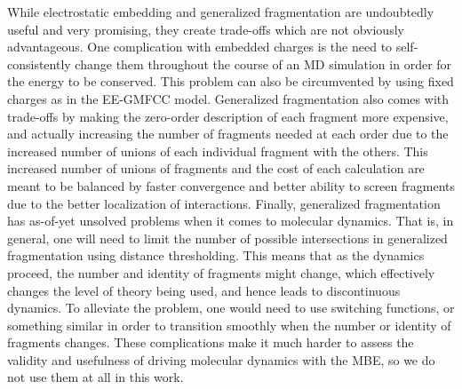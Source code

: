 \documentclass[11pt, proquest]{uwthesis}[2020/02/24]
\begin{document}
\par While electrostatic embedding and generalized fragmentation are undoubtedly useful and very promising, they create trade-offs which are not obviously advantageous. One complication with embedded charges is the need to self-consistently change them throughout the course of an MD simulation in order for the energy to be conserved.\autocite{liu_variational_2019} This problem can also be circumvented by using fixed charges as in the EE-GMFCC model. Generalized fragmentation also comes with trade-offs by making the zero-order description of each fragment more expensive, and actually increasing the number of fragments needed at each order due to the increased number of unions of each individual fragment with the others. This increased number of unions of fragments and the cost of each calculation are meant to be balanced by faster convergence and better ability to screen fragments due to the better localization of interactions. Finally, generalized fragmentation has as-of-yet unsolved problems when it comes to molecular dynamics. That is, in general, one will need to limit the number of possible intersections in generalized fragmentation using distance thresholding. This means that as the dynamics proceed, the number and identity of fragments might change, which effectively changes the level of theory being used, and hence leads to discontinuous dynamics. To alleviate the problem, one would need to use switching functions, or something similar in order to transition smoothly when the number or identity of fragments changes. These complications make it much harder to assess the validity and usefulness of driving molecular dynamics with the MBE, so we do not use them at all in this work.
\end{document}
